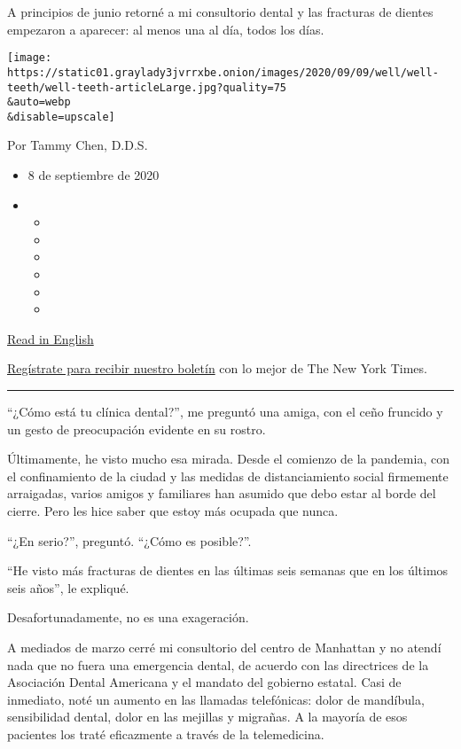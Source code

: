 A principios de junio retorné a mi consultorio dental y las fracturas de
dientes empezaron a aparecer: al menos una al día, todos los días.

\texttt{[image: https://static01.graylady3jvrrxbe.onion/images/2020/09/09/well/well-teeth/well-teeth-articleLarge.jpg?quality=75\\\&auto=webp\\\&disable=upscale]}

Por Tammy Chen, D.D.S.

\begin{itemize}
\item
  8 de septiembre de 2020
\item
  \begin{itemize}
  \item
  \item
  \item
  \item
  \item
  \item
  \end{itemize}
\end{itemize}

\href{https://www.nytimes3xbfgragh.onion/2020/09/08/well/live/dentists-tooth-teeth-cracks-fractures-coronavirus-stress-grinding.html}{Read
in English}

\href{https://www.nytimes3xbfgragh.onion/newsletters/el-times}{Regístrate
para recibir nuestro boletín} con lo mejor de The New York Times.

\begin{center}\rule{0.5\linewidth}{\linethickness}\end{center}

``¿Cómo está tu clínica dental?'', me preguntó una amiga, con el ceño
fruncido y un gesto de preocupación evidente en su rostro.

Últimamente, he visto mucho esa mirada. Desde el comienzo de la
pandemia, con el confinamiento de la ciudad y las medidas de
distanciamiento social firmemente arraigadas, varios amigos y familiares
han asumido que debo estar al borde del cierre. Pero les hice saber que
estoy más ocupada que nunca.

``¿En serio?'', preguntó. ``¿Cómo es posible?''.

``He visto más fracturas de dientes en las últimas seis semanas que en
los últimos seis años'', le expliqué.

Desafortunadamente, no es una exageración.

A mediados de marzo cerré mi consultorio del centro de Manhattan y no
atendí nada que no fuera una emergencia dental, de acuerdo con las
directrices de la Asociación Dental Americana y el mandato del gobierno
estatal. Casi de inmediato, noté un aumento en las llamadas telefónicas:
dolor de mandíbula, sensibilidad dental, dolor en las mejillas y
migrañas. A la mayoría de esos pacientes los traté eficazmente a través
de la telemedicina.

